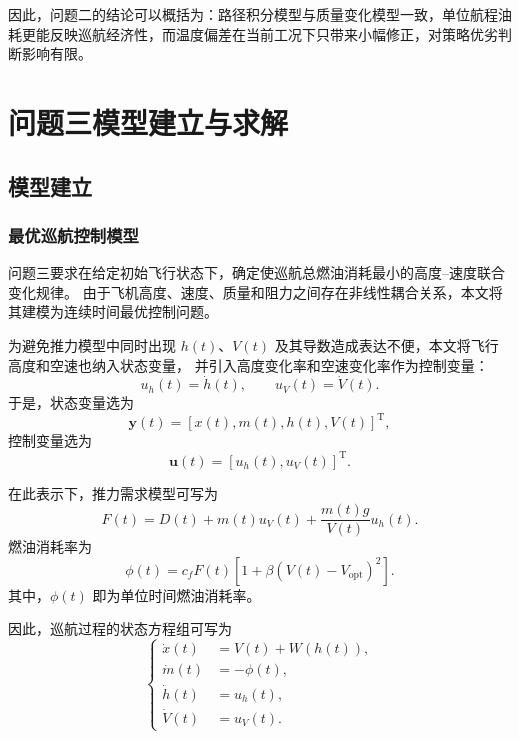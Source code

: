 \documentclass[UTF8]{ctexart}
\begin{document}
因此，问题二的结论可以概括为：路径积分模型与质量变化模型一致，单位航程油耗更能反映巡航经济性，而温度偏差在当前工况下只带来小幅修正，对策略优劣判断影响有限。
\section{问题三模型建立与求解}
\subsection{模型建立}
\subsubsection{最优巡航控制模型}

问题三要求在给定初始飞行状态下，确定使巡航总燃油消耗最小的高度--速度联合变化规律。
由于飞机高度、速度、质量和阻力之间存在非线性耦合关系，本文将其建模为连续时间最优控制问题。

为避免推力模型中同时出现 $h(t)$、$V(t)$ 及其导数造成表达不便，本文将飞行高度和空速也纳入状态变量，
并引入高度变化率和空速变化率作为控制变量：
\begin{equation}
    u_h(t)=\dot h(t),\qquad u_V(t)=\dot V(t).
    \label{eq:q3_controls}
\end{equation}
于是，状态变量选为
\begin{equation}
    \boldsymbol{y}(t)=\left[x(t),m(t),h(t),V(t)\right]^{\mathrm T},
    \label{eq:q3_states}
\end{equation}
控制变量选为
\begin{equation}
    \boldsymbol{u}(t)=\left[u_h(t),u_V(t)\right]^{\mathrm T}.
    \label{eq:q3_control_vector}
\end{equation}

在此表示下，推力需求模型可写为
\begin{equation}
    F(t)
    =
    D(t)+m(t)u_V(t)+\frac{m(t)g}{V(t)}u_h(t).
    \label{eq:q3_thrust}
\end{equation}
燃油消耗率为
\begin{equation}
    \phi(t)
    =
    c_fF(t)
    \left[
    1+\beta\left(V(t)-V_{\mathrm{opt}}\right)^2
    \right].
    \label{eq:q3_phi}
\end{equation}
其中，$\phi(t)$ 即为单位时间燃油消耗率。

因此，巡航过程的状态方程组可写为
\begin{equation}
\left\{
\begin{aligned}
    \dot x(t) &= V(t)+W(h(t)),\\
    \dot m(t) &= -\phi(t),\\
    \dot h(t) &= u_h(t),\\
    \dot V(t) &= u_V(t).
\end{aligned}
\right.
\label{eq:q3_state_equations}
\end{equation}
\end{document}
